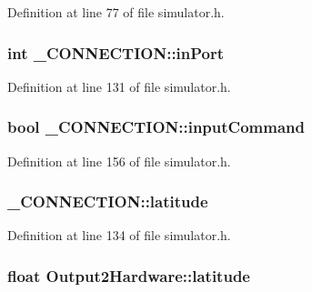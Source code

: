 \-Definition at line 77 of file simulator.\-h.

\hypertarget{group___h_i_t_l_plugin_gabf3d6472bdcac5895a53143e1f84fb09}{
\subsubsection[{in\-Port}]{\setlength{\rightskip}{0pt plus 5cm}int {\bf \-\_\-\-C\-O\-N\-N\-E\-C\-T\-I\-O\-N\-::in\-Port}}}\label{group___h_i_t_l_plugin_gabf3d6472bdcac5895a53143e1f84fb09}


\-Definition at line 131 of file simulator.\-h.

\hypertarget{group___h_i_t_l_plugin_gaef59cc30b3dc3c996cfba35065d250bd}{
\subsubsection[{input\-Command}]{\setlength{\rightskip}{0pt plus 5cm}bool {\bf \-\_\-\-C\-O\-N\-N\-E\-C\-T\-I\-O\-N\-::input\-Command}}}\label{group___h_i_t_l_plugin_gaef59cc30b3dc3c996cfba35065d250bd}


\-Definition at line 156 of file simulator.\-h.

\hypertarget{group___h_i_t_l_plugin_gac06d25b8e020f633a60fadb7e7eedfa9}{
\subsubsection[{latitude}]{ {\bf \-\_\-\-C\-O\-N\-N\-E\-C\-T\-I\-O\-N\-::latitude}}}\label{group___h_i_t_l_plugin_gac06d25b8e020f633a60fadb7e7eedfa9}


\-Definition at line 134 of file simulator.\-h.

\hypertarget{group___h_i_t_l_plugin_ga3f453b19b12f4264ebffe76a1e8ee93d}{
\subsubsection[{latitude}]{\setlength{\rightskip}{0pt plus 5cm}float {\bf \-Output2\-Hardware\-::latitude}}}\label{group___h_i_t_l_plugin_ga3f453b19b12f4264ebffe76a1e8ee93d}


